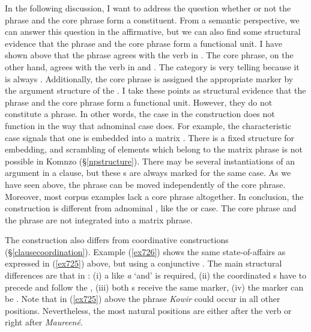 In the following discussion, I want to address the question whether or not the  phrase and the core phrase form a constituent. From a semantic perspective, we can answer this question in the affirmative, but we can also find some structural evidence that the  phrase and the core phrase form a functional unit. I have shown above that the  phrase agrees with the verb in . The core phrase, on the other hand, agrees with the verb in  and . The  category is very telling because it is always . Additionally, the core phrase is assigned the appropriate  marker by the argument structure of the . I take these points as structural evidence that the  phrase and the core phrase form a functional unit. However, they do not constitute a phrase. In other words, the  case in the  construction does not function in the way that adnominal case does. For example, the characteristic case signals that one  is embedded into a matrix . There is a fixed structure for embedding, and scrambling of elements which belong to the matrix phrase is not possible in Komnzo ({\S}\ref{npstructure}). There may be several instantiations of an argument in a clause, but these s are always marked for the same case. As we have seen above, the  phrase can be moved independently of the core phrase. Moreover, most corpus examples lack a core phrase altogether. In conclusion, the  construction is different from adnominal , like the  or  case. The core phrase and the  phrase are not integrated into a matrix phrase.

The  construction also differs from coordinative constructions ({\S}\ref{clausecoordination}). Example (\ref{ex726}) shows the same state-of-affairs as expressed in (\ref{ex725}) above, but using a conjunctive . The main structural differences are that in : (i) a  like \emph{a} `and' is required, (ii) the coordinated s have to precede and follow the , (iii) both s receive the same  marker, (iv) the  marker can be . Note that in (\ref{ex725}) above the  phrase \emph{Kowir} could occur in all other positions. Nevertheless, the most natural positions are either after the verb or right after \emph{Maureené}.

